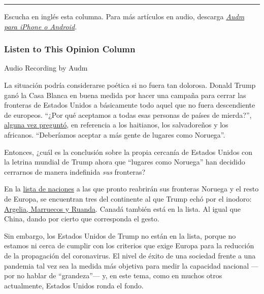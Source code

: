 \begin{center}\rule{0.5\linewidth}{\linethickness}\end{center}

Escucha en inglés esta columna. Para más artículos en audio, descarga
\href{https://www.audm.com/?utm_source=nytopinion\&utm_medium=embed\&utm_campaign=world_america_out}{\emph{Audm
para iPhone o Android}}\emph{.}

\hypertarget{listen-to-this-opinion-column}{%
\subsubsection{Listen to This Opinion
Column}\label{listen-to-this-opinion-column}}

Audio Recording by Audm

La situación podría considerarse poética si no fuera tan dolorosa.
Donald Trump ganó la Casa Blanca en buena medida por hacer una campaña
para cerrar las fronteras de Estados Unidos a básicamente todo aquel que
no fuera descendiente de europeos. ``¿Por qué aceptamos a todas esas
personas de países de mierda?'',
\href{https://www.washingtonpost.com/politics/trump-attacks-protections-for-immigrants-from-shithole-countries-in-oval-office-meeting/2018/01/11/bfc0725c-f711-11e7-91af-31ac729add94_story.html}{alguna
vez preguntó}, en referencia a los haitianos, los salvadoreños y los
africanos. ``Deberíamos aceptar a más gente de lugares como Noruega''.

Entonces, ¿cuál es la conclusión sobre la propia cercanía de Estados
Unidos con la letrina mundial de Trump ahora que ``lugares como
Noruega'' han decidido cerrarnos de manera indefinida \emph{sus}
fronteras?

En la
\href{https://www.consilium.europa.eu/en/press/press-releases/2020/06/30/council-agrees-to-start-lifting-travel-restrictions-for-residents-of-some-third-countries/}{lista
de naciones} a las que pronto reabrirán sus fronteras Noruega y el resto
de Europa, se encuentran tres del continente al que Trump echó por el
inodoro:
\href{https://www.nytimes.com/2020/06/30/world/europe/eu-reopening-blocks-us-travelers.html}{Argelia,
Marruecos y Ruanda}. Canadá también está en la lista. Al igual que
China, dando por cierto que corresponda el gesto.

Sin embargo, los Estados Unidos de Trump no están en la lista, porque no
estamos ni cerca de cumplir con los criterios que exige Europa para la
reducción de la propagación del coronavirus. El nivel de éxito de una
sociedad frente a una pandemia tal vez sea la medida más objetiva para
medir la capacidad nacional ---por no hablar de ``grandeza''--- y, en
este tema, como en muchos otros actualmente, Estados Unidos ronda el
fondo.


